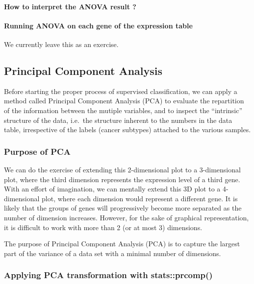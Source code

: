 \paragraph{How to interpret the ANOVA result
?}\label{how-to-interpret-the-anova-result}

\paragraph{Running ANOVA on each gene of the expression
table}\label{running-anova-on-each-gene-of-the-expression-table}

{We currently leave this as an exercise.}

\subsection{Principal Component
Analysis}\label{principal-component-analysis}

Before starting the proper process of supervised classification, we can
apply a method called Principal Component Analysis ({PCA}) to evaluate
the repartition of the information between the mutiple variables, and to
inspect the ``intrinsic'' structure of the data, i.e.~the structure
inherent to the numbers in the data table, irrespective of the labels
(cancer subtypes) attached to the various samples.

\subsubsection{Purpose of PCA}\label{purpose-of-pca}

We can do the exercise of extending this 2-dimensional plot to a
3-dimensional plot, where the third dimension represents the expression
level of a third gene. With an effort of imagination, we can mentally
extend this 3D plot to a 4-dimensional plot, where each dimension would
represent a different gene. It is likely that the groups of genes will
progressively become more separated as the number of dimension
increases. However, for the sake of graphical representation, it is
difficult to work with more than 2 (or at most 3) dimensions.

The purpose of {Principal Component Analysis} ({PCA}) is to capture the
largest part of the variance of a data set with a minimal number of
dimensions.

\subsubsection{Applying PCA transformation with
stats::prcomp()}\label{applying-pca-transformation-with-statsprcomp}

